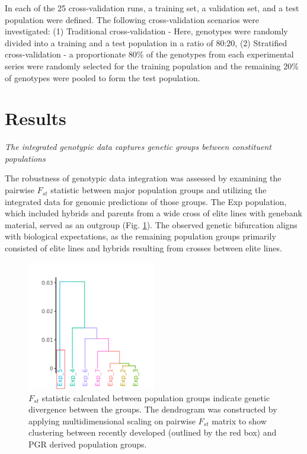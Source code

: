 \documentclass[english, biblatex]{lni}
\begin{document}
In each of the 25 cross-validation runs, a training set, a validation set, and a test population were defined. The following cross-validation scenarios were investigated: (1) Traditional cross-validation - Here, genotypes were randomly divided into a training and a test population in a ratio of 80:20, (2) Stratified cross-validation - a proportionate 80\% of the genotypes from each experimental series were randomly selected for the training population and the remaining 20\% of genotypes were pooled to form the test population.

\section{Results}
\textit{The integrated genotypic data captures genetic groups between constituent populations} 

The robustness of genotypic data integration was assessed by examining the pairwise $F_{st}$ statistic between major population groups and utilizing the integrated data for genomic predictions of those groups. The Exp population, which included hybrids and parents from a wide cross of elite lines with genebank material, served as an outgroup (Fig. \ref{fig_fst_plot}). The observed genetic bifurcation aligns with biological expectations, as the remaining population groups primarily consisted of elite lines and hybrids resulting from crosses between elite lines.

\begin{figure}[h]
    \centering
    \includegraphics[width=0.5\textwidth]{fst_plot}
    \caption{$F_{st}$ statistic calculated between population groups indicate genetic divergence between the groups. The dendrogram was constructed by applying multidimensional scaling on pairwise $F_{st}$ matrix to show clustering between recently developed (outlined by the red box) and PGR derived population groups.}
    \label{fig_fst_plot}
\end{figure}
\end{document}
